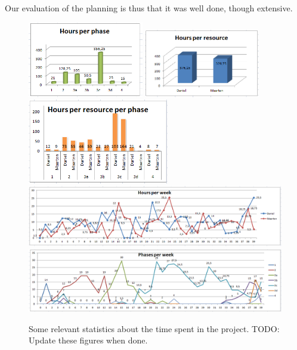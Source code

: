 Our evaluation of the planning is thus that it was well done, though extensive.
%
\begin{figure}[htb!]
	\centering
	\includegraphics[width=0.45\textwidth]{Figures/HoursPerPhase}
	\includegraphics[width=0.45\textwidth]{Figures/HoursPerResource}
	\includegraphics[width=0.55\textwidth]{Figures/HoursPerResourcePerPhase}
	\includegraphics[width=1.00\textwidth]{Figures/HoursPerWeek}
	\includegraphics[width=1.00\textwidth]{Figures/HoursPerPhasePerWeek}
	\caption{Some relevant statistics about the time spent in the project.
    TODO: Update these figures when done.}
	\label{fig:hour-statistics}
\end{figure}
